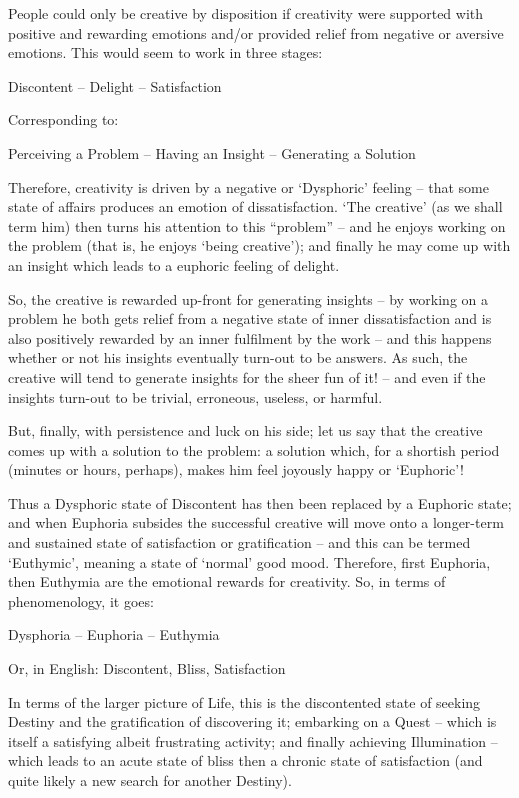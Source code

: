 \documentclass[
]{book}
\begin{document}
People could only be creative by disposition if creativity were supported with positive and rewarding emotions and/or provided relief from negative or aversive emotions. This would seem to work in three stages:

Discontent -- Delight -- Satisfaction

Corresponding to:

Perceiving a Problem -- Having an Insight -- Generating a Solution

Therefore, creativity is driven by a negative or `Dysphoric' feeling -- that some state of affairs produces an emotion of dissatisfaction. `The creative' (as we shall term him) then turns his attention to this ``problem'' -- and he enjoys working on the problem (that is, he enjoys `being creative'); and finally he may come up with an insight which leads to a euphoric feeling of delight.

So, the creative is rewarded up-front for generating insights -- by working on a problem he both gets relief from a negative state of inner dissatisfaction and is also positively rewarded by an inner fulfilment by the work -- and this happens whether or not his insights eventually turn-out to be answers. As such, the creative will tend to generate insights for the sheer fun of it! -- and even if the insights turn-out to be trivial, erroneous, useless, or harmful.

But, finally, with persistence and luck on his side; let us say that the creative comes up with a solution to the problem: a solution which, for a shortish period (minutes or hours, perhaps), makes him feel joyously happy or `Euphoric'!

Thus a Dysphoric state of Discontent has then been replaced by a Euphoric state; and when Euphoria subsides the successful creative will move onto a longer-term and sustained state of satisfaction or gratification -- and this can be termed `Euthymic', meaning a state of `normal' good mood. Therefore, first Euphoria, then Euthymia are the emotional rewards for creativity.
So, in terms of phenomenology, it goes:

Dysphoria -- Euphoria -- Euthymia

Or, in English: Discontent, Bliss, Satisfaction

In terms of the larger picture of Life, this is the discontented state of seeking Destiny and the gratification of discovering it; embarking on a Quest -- which is itself a satisfying albeit frustrating activity; and finally achieving Illumination -- which leads to an acute state of bliss then a chronic state of satisfaction (and quite likely a new search for another Destiny).
\end{document}
